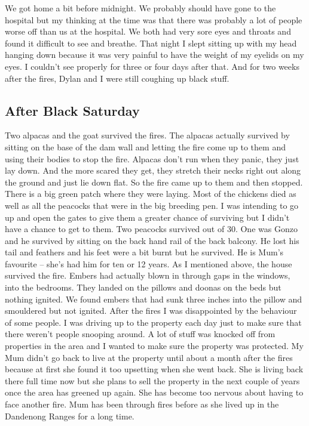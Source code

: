 \documentclass[a4paper]{article}
\begin{document}
        We got home a bit before midnight. We probably should have gone to the hospital but my thinking at the time was that there was probably a lot of people worse off than us at the hospital. We both had very sore eyes and throats and found it difficult to see and breathe. That night I slept sitting up with my head hanging down because it was very painful to have the weight of my eyelids on my eyes. I couldn't see properly for three or four days after that. And for two weeks after the fires, Dylan and I were still coughing up black stuff.

    \subsection{After Black Saturday}

        Two alpacas and the goat survived the fires. The alpacas actually survived by sitting on the base of the dam wall and letting the fire come up to them and using their bodies to stop the fire. Alpacas don't run when they panic, they just lay down. And the more scared they get, they stretch their necks right out along the ground and just lie down flat. So the fire came up to them and then stopped. There is a big green patch where they were laying.
        Most of the chickens died as well as all the peacocks that were in the big breeding pen. I was intending to go up and open the gates to give them a greater chance of surviving but I didn't have a chance to get to them. Two peacocks survived out of 30. One was Gonzo and he survived by sitting on the back hand rail of the back balcony. He lost his tail and feathers and his feet were a bit burnt but he survived. He is Mum's favourite – she's had him for ten or 12 years.
        As I mentioned above, the house survived the fire. Embers had actually blown in through gaps in the windows, into the bedrooms. They landed on the pillows and doonas on the beds but nothing ignited. We found embers that had sunk three inches into the pillow and smouldered but not ignited.
        After the fires I was disappointed by the behaviour of some people. I was driving up to the property each day just to make sure that there weren't people snooping around. A lot of stuff was knocked off from properties in the area and I wanted to make sure the property was protected.
        My Mum didn't go back to live at the property until about a month after the fires because at first she found it too upsetting when she went back. She is living back there full time now but she plans to sell the property in the next couple of years once the area has greened up again. She has become too nervous about having to face another fire. Mum has been through fires before as she lived up in the Dandenong Ranges for a long time.
\end{document}
